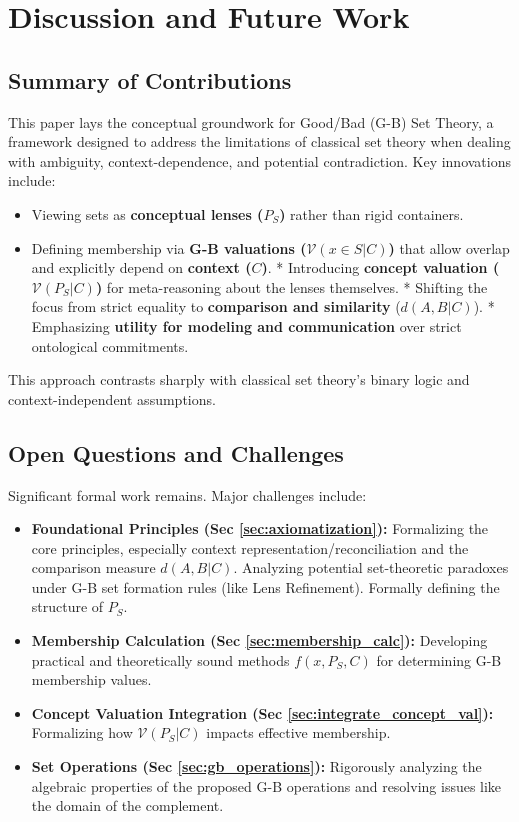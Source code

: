\documentclass[11pt]{article}
\newcommand{\gbval}[1]{\mathcal{V}(#1)}         %
\newcommand{\pset}[1]{P_{#1}}                   %
\theoremstyle{definition}
\theoremstyle{plain}
\begin{document}
\section{Discussion and Future Work} \label{sec:discussion}

\subsection{Summary of Contributions}
This paper lays the conceptual groundwork for Good/Bad (G-B) Set Theory, a framework designed to address the limitations of classical set theory when dealing with ambiguity, context-dependence, and potential contradiction. Key innovations include:
\begin{itemize}
    \item Viewing sets as \textbf{conceptual lenses ($\pset{S}$)} rather than rigid containers.
    \item Defining membership via \textbf{G-B valuations ($\gbval{x \in S|C}$)} that allow overlap and explicitly depend on \textbf{context ($C$)}.
    * Introducing \textbf{concept valuation ($\gbval{\pset{S}|C}$)} for meta-reasoning about the lenses themselves.
    * Shifting the focus from strict equality to \textbf{comparison and similarity} ($d(A, B|C)$).
    * Emphasizing \textbf{utility for modeling and communication} over strict ontological commitments.
\end{itemize}
This approach contrasts sharply with classical set theory's binary logic and context-independent assumptions.

\subsection{Open Questions and Challenges}
Significant formal work remains. Major challenges include:
\begin{itemize}
    \item \textbf{Foundational Principles (Sec \ref{sec:axiomatization}):} Formalizing the core principles, especially context representation/reconciliation and the comparison measure $d(A, B|C)$. Analyzing potential set-theoretic paradoxes under G-B set formation rules (like Lens Refinement). Formally defining the structure of $\pset{S}$.
    \item \textbf{Membership Calculation (Sec \ref{sec:membership_calc}):} Developing practical and theoretically sound methods $f(x, \pset{S}, C)$ for determining G-B membership values.
    \item \textbf{Concept Valuation Integration (Sec \ref{sec:integrate_concept_val}):} Formalizing how $\gbval{\pset{S}|C}$ impacts effective membership.
    \item \textbf{Set Operations (Sec \ref{sec:gb_operations}):} Rigorously analyzing the algebraic properties of the proposed G-B operations and resolving issues like the domain of the complement.
\end{itemize}
\end{document}
